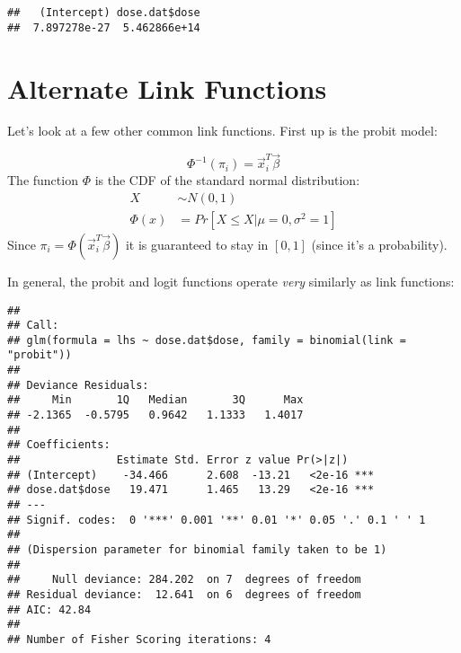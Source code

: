 \documentclass[
]{article}
\newenvironment{Shaded}{\begin{snugshade}}{\end{snugshade}}
\newcommand{\AttributeTok}[1]{\textcolor[rgb]{0.77,0.63,0.00}{#1}}
\newcommand{\FunctionTok}[1]{\textcolor[rgb]{0.00,0.00,0.00}{#1}}
\newcommand{\NormalTok}[1]{#1}
\newcommand{\OtherTok}[1]{\textcolor[rgb]{0.56,0.35,0.01}{#1}}
\newcommand{\SpecialCharTok}[1]{\textcolor[rgb]{0.00,0.00,0.00}{#1}}
\newcommand{\StringTok}[1]{\textcolor[rgb]{0.31,0.60,0.02}{#1}}
\begin{document}
\begin{verbatim}
##   (Intercept) dose.dat$dose 
##  7.897278e-27  5.462866e+14
\end{verbatim}

\hypertarget{alternate-link-functions}{%
\section{Alternate Link Functions}\label{alternate-link-functions}}

Let's look at a few other common link functions. First up is the probit
model:

\[
\Phi^{-1}(\pi_i) = \vec{x}_i^T \vec{\beta}
\] The function \(\Phi\) is the CDF of the standard normal distribution:
\[
\begin{split}
X &\sim N(0,1)\\
\Phi(x) &= Pr[X \leq X| \mu=0, \sigma^2=1]
\end{split}
\] Since \(\pi_i = \Phi(\vec{x}_i^T \vec{\beta})\) it is guaranteed to
stay in \([0,1]\) (since it's a probability).

In general, the probit and logit functions operate \emph{very} similarly
as link functions:

\begin{Shaded}
\end{Shaded}

\begin{verbatim}
## 
## Call:
## glm(formula = lhs ~ dose.dat$dose, family = binomial(link = "probit"))
## 
## Deviance Residuals: 
##     Min       1Q   Median       3Q      Max  
## -2.1365  -0.5795   0.9642   1.1333   1.4017  
## 
## Coefficients:
##               Estimate Std. Error z value Pr(>|z|)    
## (Intercept)    -34.466      2.608  -13.21   <2e-16 ***
## dose.dat$dose   19.471      1.465   13.29   <2e-16 ***
## ---
## Signif. codes:  0 '***' 0.001 '**' 0.01 '*' 0.05 '.' 0.1 ' ' 1
## 
## (Dispersion parameter for binomial family taken to be 1)
## 
##     Null deviance: 284.202  on 7  degrees of freedom
## Residual deviance:  12.641  on 6  degrees of freedom
## AIC: 42.84
## 
## Number of Fisher Scoring iterations: 4
\end{verbatim}
\end{document}
